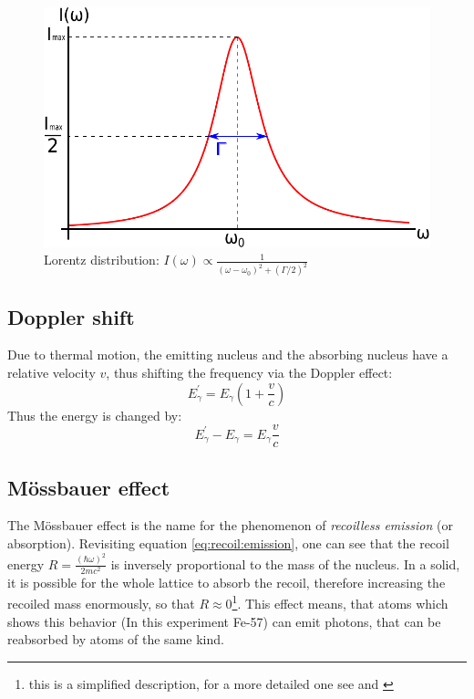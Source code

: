 \begin{figure}[hpbt]
	\centering
	\includegraphics[height=0.25\textheight]{graphics/Lorentz.pdf}
	\caption[Lorentz distribution]{Lorentz distribution: $I(\omega) \propto \frac{1}{(\omega-\omega_0)^2+(\Gamma /2)^2}$\\}
	\label{fig:principles:lorentz}
\end{figure}

\subsection{Doppler shift}
Due to thermal motion, the emitting nucleus and the absorbing nucleus have a relative velocity $v$, thus shifting the frequency via the Doppler effect:  
\begin{equation}
E_\gamma^{'} = E_\gamma (1+\frac{v}{c}) 
\label{eq:doppler shift}
\end{equation}
Thus the energy is changed by:
\begin{equation}
E_\gamma^{'} - E_\gamma = E_\gamma \frac{v}{c}
\label{eq:diffdopplershift}
\end{equation}


\subsection{Mössbauer effect}
The Mössbauer effect is the name for the phenomenon of \emph{recoilless emission} (or absorption). Revisiting equation \ref{eq:recoil:emission}, one can see that the recoil energy $R=\frac{(\hbar \omega)^2}{2mc^2}$ is inversely proportional to the mass of the nucleus. In a solid, it is possible for the whole lattice to absorb the recoil, therefore increasing the recoiled mass enormously, so that $R\approx0$\footnote{this is a simplified description, for a more detailed one see \cite{Eyges} and \cite{Wegener} }. This effect means, that atoms which shows this behavior (In this experiment Fe-57) can emit photons, that can be reabsorbed by atoms of the same kind.


